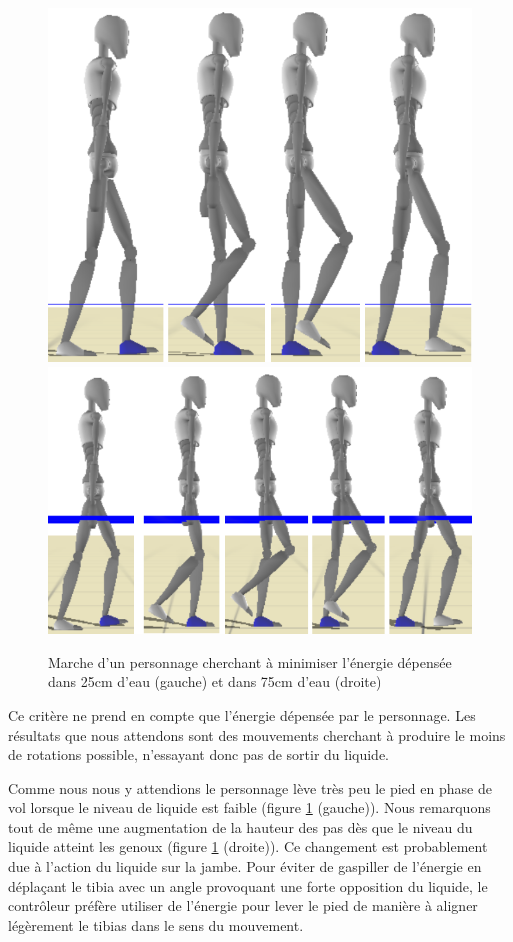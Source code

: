 \documentclass[runningheads,a4paper]{llncs}
\begin{document}
\begin{figure}[h]
\centering
\includegraphics[scale=0.3]{strips/min_torque_25cm.png}
\includegraphics[scale=0.4]{strips/min_torque_75cm.png}
\caption{Marche d'un personnage cherchant à minimiser l'énergie dépensée dans 25cm d'eau (gauche) et dans 75cm d'eau (droite)}
\label{fig:min_energ}
\end{figure}


Ce critère ne prend en compte que l'énergie dépensée par le personnage. Les résultats que nous attendons sont des mouvements cherchant à produire le moins de rotations possible, n'essayant donc pas de sortir du liquide.

Comme nous nous y attendions le personnage lève très peu le pied en phase de vol lorsque le niveau de liquide est faible (figure \ref{fig:min_energ} (gauche)). Nous remarquons tout de même une augmentation de la hauteur des pas dès que le niveau du liquide atteint les genoux (figure \ref{fig:min_energ} (droite)). Ce changement est probablement due à l'action du liquide sur la jambe. Pour éviter de gaspiller de l'énergie en déplaçant le tibia avec un angle provoquant une forte opposition du liquide, le contrôleur préfère utiliser de l'énergie pour lever le pied de manière à aligner légèrement le tibias dans le sens du mouvement. 
\end{document}
